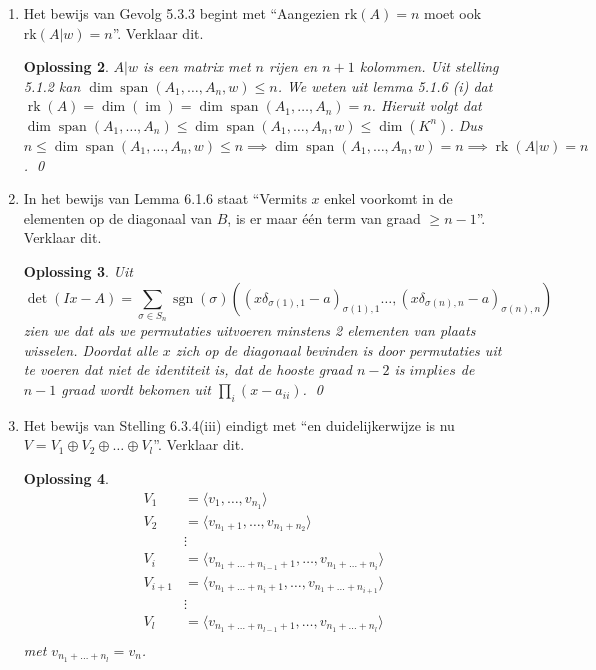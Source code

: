 \documentclass[a4paper,12pt]{article}
\newtheorem{oplossing}{Oplossing}
\begin{document}
\begin{enumerate}
\begin{oplossing}
        Inverteerbaarheid volgt door hetzelfde te doen maar met \(\mathcal{B} \to \mathcal{B}'\) en \(\mathcal{B}' \to \mathcal{B}\).
        \qed
    \end{oplossing}
    \item[(iv)] Het bewijs van Gevolg 5.3.3 begint met ``Aangezien $\text{rk}(A)=n$ moet ook $\text{rk}(A|w)=n$''. Verklaar dit.
    \begin{oplossing}
        \(A|w\) is een matrix met \(n\) rijen en \(n+1\) kolommen. Uit stelling 5.1.2 kan \(\dim\operatorname{span}(A_1, \dots ,A_n,w ) \leq n\).
        We weten uit lemma 5.1.6 (i) dat \(\operatorname{rk}(A) = \dim(\operatorname{im}) = \dim\operatorname{span}(A_1, \dots ,A_n ) = n \).
        Hieruit volgt dat \(\dim \operatorname{span}(A_1, \dots ,A_n ) \le \dim\operatorname{span}(A_1, \dots ,A_n,w ) \le \dim(K^n) \).
        Dus \(n \le \dim\operatorname{span}(A_1, \dots ,A_n,w ) \le n \implies \dim \operatorname{span}(A_1, \dots ,A_n,w ) = n \implies \operatorname{rk}(A|w) = n\).
        \qed
    \end{oplossing}
    \item[(v)] In het bewijs van Lemma 6.1.6 staat ``Vermits $x$ enkel voorkomt in de elementen op de diagonaal van $B$, is er maar één term van graad $\geq n-1$''. Verklaar dit.
    \begin{oplossing}
        Uit
        \[\det (Ix-A) = \sum_{\sigma \in S_n} \operatorname{sgn} (\sigma)((x\delta_{\sigma (1),1}-a)_{\sigma (1),1 }\dots , (x\delta_{\sigma (n),n}-a)_{\sigma (n),n})\]
        zien we dat als we permutaties uitvoeren minstens 2 elementen van plaats wisselen.
        Doordat alle \(x\) zich op de diagonaal bevinden is door permutaties uit te voeren dat niet de identiteit is,
        dat de hooste graad \(n-2\) is \(implies\) de \(n-1\) graad wordt bekomen uit  \(\prod_i (x-a_{ii})\).
        \qed
    \end{oplossing}
    \item[(vi)] Het bewijs van Stelling 6.3.4(iii) eindigt met ``en duidelijkerwijze is nu $V=V_{1}\oplus V_{2}\oplus \dots \oplus V_{l}$''. Verklaar dit.
    \begin{oplossing}
        \begin{align*}
            V_1 &= \langle v_1 , \dots, v_{n_1}\rangle \\
            V_2 &= \langle v_{n_1 + 1} , \dots, v_{n_1 + n_2}\rangle \\
            &\vdots \\
            V_i &= \langle v_{n_1 + \dots + n_{i-1} +1} , \dots, v_{n_1 + \dots + n_i}\rangle \\
            V_{i+1} &= \langle v_{n_1 + \dots + n_{i} +1} , \dots, v_{n_1 + \dots + n_{i+1}}\rangle \\
            &\vdots \\
            V_{l} &= \langle v_{n_1 + \dots + n_{l-1} + 1} , \dots, v_{n_1 + \dots + n_{l}}\rangle \\
        \end{align*}
        met \(v_{n_1 + \dots + n_{l}} = v_n\).


\end{oplossing}
\end{enumerate}
\end{document}

